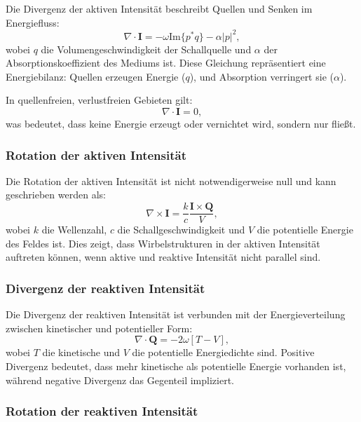 Die Divergenz der aktiven Intensität beschreibt Quellen und Senken im Energiefluss:
\begin{equation}
\nabla \cdot \boldsymbol{I} = -\omega\text{Im}\{p^*q\} - \alpha|p|^2,
\end{equation}
wobei $q$ die Volumengeschwindigkeit der Schallquelle und $\alpha$ der Absorptionskoeffizient des Mediums ist. Diese Gleichung repräsentiert eine Energiebilanz: Quellen erzeugen Energie ($q$), und Absorption verringert sie ($\alpha$).

In quellenfreien, verlustfreien Gebieten gilt:
\begin{equation}
\nabla \cdot \boldsymbol{I} = 0,
\end{equation}
was bedeutet, dass keine Energie erzeugt oder vernichtet wird, sondern nur fließt.

\subsubsection{Rotation der aktiven Intensität}

Die Rotation der aktiven Intensität ist nicht notwendigerweise null und kann geschrieben werden als:
\begin{equation}
\nabla \times \boldsymbol{I} = \frac{k}{c} \frac{\boldsymbol{I} \times \boldsymbol{Q}}{V},
\end{equation}
wobei $k$ die Wellenzahl, $c$ die Schallgeschwindigkeit und $V$ die potentielle Energie des Feldes ist. Dies zeigt, dass Wirbelstrukturen in der aktiven Intensität auftreten können, wenn aktive und reaktive Intensität nicht parallel sind.

\subsubsection{Divergenz der reaktiven Intensität}

Die Divergenz der reaktiven Intensität ist verbunden mit der Energieverteilung zwischen kinetischer und potentieller Form:
\begin{equation}
\nabla \cdot \boldsymbol{Q} = -2 \omega [T-V],
\end{equation}
wobei $T$ die kinetische und $V$ die potentielle Energiedichte sind. Positive Divergenz bedeutet, dass mehr kinetische als potentielle Energie vorhanden ist, während negative Divergenz das Gegenteil impliziert.

\subsubsection{Rotation der reaktiven Intensität}

